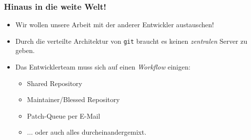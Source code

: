 \documentclass{beamer}
\begin{document}
\begin{frame}
 \frametitle{Hinaus in die weite Welt!}
\begin{itemize}
	\item Wir wollen unsere Arbeit mit der anderer Entwickler austauschen!
	\item Durch die verteilte Architektur von \texttt{git} braucht es keinen \emph{zentralen} Server zu geben.
	\item Das Entwicklerteam muss sich auf einen \emph{Workflow} einigen:
	\begin{itemize}
		\item Shared Repository
		\item Maintainer/Blessed Repository
		\item Patch-Queue per E-Mail
		\item ... oder auch alles durcheinandergemixt.
	\end{itemize}
\end{itemize}
 \end{frame}
\end{document}
